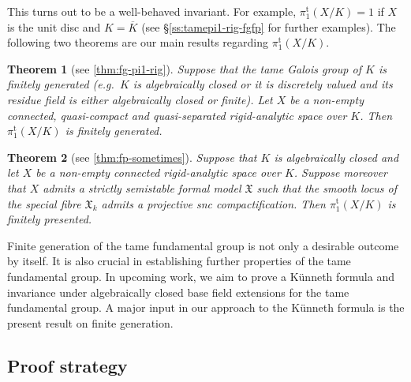 \documentclass[a4paper,twoside,11pt,reqno]{amsart}
\DeclareRobustCommand{\SkipTocEntry}[5]{}
\newcommand{\fX}{{\mathfrak{X}}}
\newcommand{\pitame}{\pi_1^{\mathrm{t}}}
\newtheorem{thmABC}{Theorem}
\theoremstyle{definition}
\numberwithin{equation}{subsection}
\begin{document}
This turns out to be a well-behaved invariant. For example, $\pitame(X/K)=1$ if $X$ is the unit disc and $K=\overline{K}$ (see \S\ref{ss:tamepi1-rig-fgfp} for further examples).  The following two theorems are our main results regarding $\pitame(X/K)$.

\begin{thmABC}[{see \cref{thm:fg-pi1-rig}}] \label{thmABC:analytic pi1tame fg}
    Suppose that the tame Galois group of $K$ is finitely generated (e.g.\ $K$ is algebraically closed or it is discretely valued and its residue field is either algebraically closed or finite). Let $X$ be a non-empty connected, quasi-compact and quasi-separated rigid-analytic space over $K$. 
    Then $\pitame(X/K)$ is finitely generated.
\end{thmABC}

\begin{thmABC}[{see \cref{thm:fp-sometimes}}] \label{thmABC:analytic pi1tame fp}
    Suppose that $K$ is algebraically closed and let $X$ be a non-empty connected rigid-analytic space over $K$. Suppose moreover that $X$ admits a strictly semistable formal model $\fX$ such that the smooth locus of the special fibre $\fX_k$ admits a projective snc compactification. Then $\pitame(X/K)$ is finitely presented. 
\end{thmABC}

Finite generation of the tame fundamental group is not only a desirable outcome by itself.
It is also crucial in establishing further properties of the tame fundamental group.
In upcoming work, we aim to prove a Künneth formula and invariance under algebraically closed base field extensions for the tame fundamental group.
A major input in our approach to the Künneth formula is the present result on finite generation.


\subsection*{Proof strategy}
\end{document}

